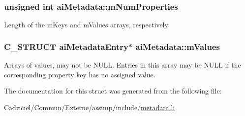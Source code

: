 \subsubsection[{\texorpdfstring{m\+Num\+Properties}{mNumProperties}}]{\setlength{\rightskip}{0pt plus 5cm}unsigned int ai\+Metadata\+::m\+Num\+Properties}\hypertarget{structai_metadata_a32c4587c53dd402a5878ffc94088e528}{}\label{structai_metadata_a32c4587c53dd402a5878ffc94088e528}
Length of the m\+Keys and m\+Values arrays, respectively 
\subsubsection[{\texorpdfstring{m\+Values}{mValues}}]{\setlength{\rightskip}{0pt plus 5cm}C\+\_\+\+S\+T\+R\+U\+CT {\bf ai\+Metadata\+Entry}$\ast$ ai\+Metadata\+::m\+Values}\hypertarget{structai_metadata_a34b515fcb5b806c471d3c6ce7bc76beb}{}\label{structai_metadata_a34b515fcb5b806c471d3c6ce7bc76beb}
Arrays of values, may not be N\+U\+LL. Entries in this array may be N\+U\+LL if the corresponding property key has no assigned value. 

The documentation for this struct was generated from the following file\+:\begin{DoxyCompactItemize}
\item 
Cadriciel/\+Commun/\+Externe/assimp/include/\hyperlink{metadata_8h}{metadata.\+h}\end{DoxyCompactItemize}
